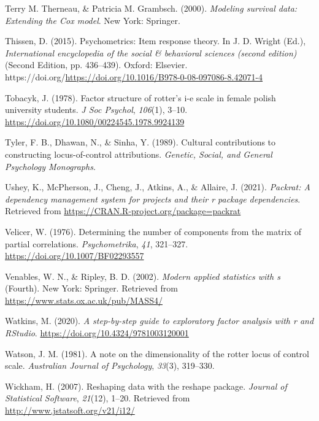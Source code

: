 \documentclass[
  man]{apa6}
\newlength{\cslhangindent}
\newlength{\cslentryspacingunit} %
\newenvironment{CSLReferences}[2] %
 {%
  \setlength{\parindent}{0pt}
  \ifodd #1
  \let\oldpar\par
  \def\par{\hangindent=\cslhangindent\oldpar}
  \fi
  \setlength{\parskip}{#2\cslentryspacingunit}
 }%
 {}
\begin{document}
\begin{CSLReferences}{1}{0}
\leavevmode{}%
Terry M. Therneau, \& Patricia M. Grambsch. (2000). \emph{Modeling survival data: Extending the {C}ox model}. New York: Springer.

\leavevmode{}%
Thissen, D. (2015). Psychometrics: Item response theory. In J. D. Wright (Ed.), \emph{International encyclopedia of the social \& behavioral sciences (second edition)} (Second Edition, pp. 436--439). Oxford: Elsevier. https://doi.org/\url{https://doi.org/10.1016/B978-0-08-097086-8.42071-4}

\leavevmode{}%
Tobacyk, J. (1978). Factor structure of rotter's i-e scale in female polish university students. \emph{J Soc Psychol}, \emph{106}(1), 3--10. \url{https://doi.org/10.1080/00224545.1978.9924139}

\leavevmode{}%
Tyler, F. B., Dhawan, N., \& Sinha, Y. (1989). Cultural contributions to constructing locus-of-control attributions. \emph{Genetic, Social, and General Psychology Monographs}.

\leavevmode{}%
Ushey, K., McPherson, J., Cheng, J., Atkins, A., \& Allaire, J. (2021). \emph{Packrat: A dependency management system for projects and their r package dependencies}. Retrieved from \url{https://CRAN.R-project.org/package=packrat}

\leavevmode{}%
Velicer, W. (1976). Determining the number of components from the matrix of partial correlations. \emph{Psychometrika}, \emph{41}, 321--327. \url{https://doi.org/10.1007/BF02293557}

\leavevmode{}%
Venables, W. N., \& Ripley, B. D. (2002). \emph{Modern applied statistics with s} (Fourth). New York: Springer. Retrieved from \url{https://www.stats.ox.ac.uk/pub/MASS4/}

\leavevmode{}%
Watkins, M. (2020). \emph{A step-by-step guide to exploratory factor analysis with r and RStudio}. \url{https://doi.org/10.4324/9781003120001}

\leavevmode{}%
Watson, J. M. (1981). A note on the dimensionality of the rotter locus of control scale. \emph{Australian Journal of Psychology}, \emph{33}(3), 319--330.

\leavevmode{}%
Wickham, H. (2007). Reshaping data with the {reshape} package. \emph{Journal of Statistical Software}, \emph{21}(12), 1--20. Retrieved from \url{http://www.jstatsoft.org/v21/i12/}


\end{CSLReferences}
\end{document}
